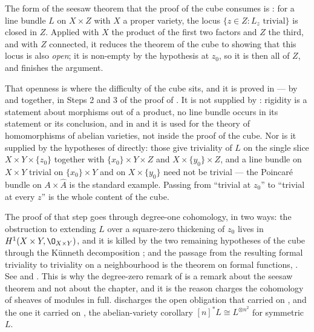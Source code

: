 \begin{remark}
\label{rem:cube-what-the-cube-uses}
The form of the seesaw theorem that the proof of the cube consumes
is : for a line bundle $L$ on $X\times Z$
with $X$ a proper variety, the locus $\{z\in Z:L_z\text{ trivial}\}$ is closed
in $Z$.  Applied with $X$ the product of the first two factors and $Z$ the
third, and with $Z$ connected, it reduces the theorem of the cube to showing
that this locus is also \emph{open}; it is non-empty by the hypothesis at
$z_0$, so it is then all of $Z$, and  finishes
the argument.

That openness is where the difficulty of the cube sits, and it is proved in
 --- by  and
 together, in Steps 2 and 3 of the proof of
.  It is not supplied by
: rigidity is a statement about morphisms out of a
product, no line bundle occurs in its statement or its conclusion, and in
\cite{MumfordAbelianVarieties} and \cite{MilneAbelianVarieties} it is used for
the theory of homomorphisms of abelian varieties, not inside the proof of the
cube.  Nor is it supplied by the hypotheses of  directly:
those give triviality of $L$ on the single slice $X\times Y\times\{z_0\}$
together with $\{x_0\}\times Y\times Z$ and $X\times\{y_0\}\times Z$, and a
line bundle on $X\times Y$ trivial on $\{x_0\}\times Y$ and on
$X\times\{y_0\}$ need not be trivial --- the Poincar\'e bundle on
$A\times\widehat A$ is the standard example.  Passing from ``trivial at
$z_0$'' to ``trivial at every $z$'' is the whole content of the cube.

The proof of that step goes through degree-one cohomology, in two ways: the
obstruction to extending $L$ over a square-zero thickening of $z_0$ lives in
$H^1(X\times Y,\O_{X\times Y})$, and it is killed by the two remaining
hypotheses of the cube through the K\"unneth decomposition
; and the passage from the resulting formal
triviality to triviality on a neighbourhood is the theorem on formal functions,
.  See
\cite[\S6]{MumfordAbelianVarieties} and \cite[I, \S5]{MilneAbelianVarieties}.
This is why the degree-zero remark of  is a remark about
the seesaw theorem and not about the chapter, and it is the reason
 charges the cohomology of sheaves of modules in full.
 discharges the open obligation that
 carried on , and
 the one it carried on ,
the abelian-variety corollary $[n]^*L\cong L^{\otimes n^2}$ for symmetric
$L$.
\end{remark}

